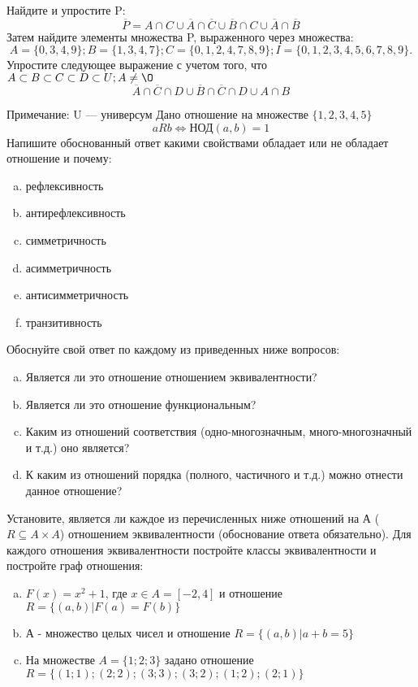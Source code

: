 \documentclass[10pt]{exam}
\begin{document}
\begin{questions}
\question
Найдите и упростите P:
\begin{equation*}
\overline{P} = A \cap C \cup \overline{A} \cap \overline{C} \cup \overline{B} \cap C \cup \overline{A} \cap \overline{B}
\end{equation*}
Затем найдите элементы множества P, выраженного через множества:
\begin{equation*}
A = \{0, 3, 4, 9\}; 
B = \{1, 3, 4, 7\};
C = \{0, 1, 2, 4, 7, 8, 9\};
I = \{0, 1, 2, 3, 4, 5, 6, 7, 8, 9\}.
\end{equation*}\question
Упростите следующее выражение с учетом того, что $A\subset B \subset C \subset D \subset U; A \neq \O$
\begin{equation*}
\overline{A} \cap \overline{C} \cap D \cup \overline{B} \cap \overline{C} \cap D \cup A \cap B
\end{equation*}

Примечание: U — универсум\question
Дано отношение на множестве $\{1, 2, 3, 4, 5\}$ 
\begin{equation*}
aRb \iff  \text{НОД}(a,b) =1
\end{equation*}
Напишите обоснованный ответ какими свойствами обладает или не обладает отношение и почему:   
\begin{enumerate} [a)]\setcounter{enumi}{0}
\item рефлексивность
\item антирефлексивность
\item симметричность
\item асимметричность
\item антисимметричность
\item транзитивность
\end{enumerate}

Обоснуйте свой ответ по каждому из приведенных ниже вопросов:
\begin{enumerate} [a)]\setcounter{enumi}{0}
    \item Является ли это отношение отношением эквивалентности?
    \item Является ли это отношение функциональным?
    \item Каким из отношений соответствия (одно-многозначным, много-многозначный и т.д.) оно является?
    \item К каким из отношений порядка (полного, частичного и т.д.) можно отнести данное отношение?
\end{enumerate}


\question
Установите, является ли каждое из перечисленных ниже отношений на А ($R \subseteq A \times A$) отношением эквивалентности (обоснование ответа обязательно). Для каждого отношения эквивалентности постройте классы эквивалентности и постройте граф отношения:
\begin{enumerate} [a)]\setcounter{enumi}{0}
\item $F(x)=x^{2}+1$, где $x \in A = [-2, 4]$ и отношение $R = \{(a,b)|F(a) = F(b)\}$
\item А - множество целых чисел и отношение $R = \{(a,b)|a + b = 5\}$
\item На множестве $A = \{1; 2; 3\}$ задано отношение $R = \{(1; 1); (2; 2); (3; 3); (3; 2); (1; 2); (2; 1)\}$


\end{enumerate}
\end{questions}
\end{document}
